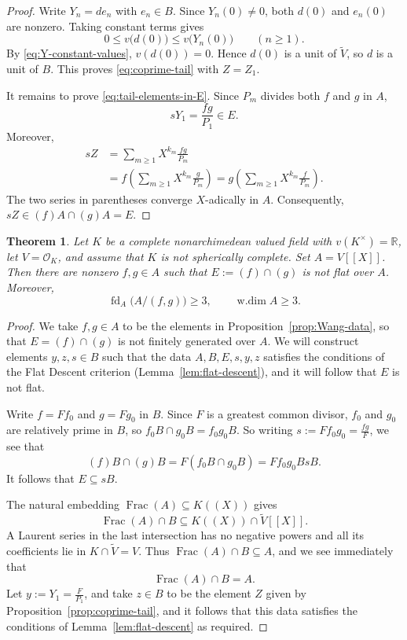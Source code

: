 \documentclass[12pt]{amsart}
\newtheorem{theorem}{Theorem}[section]
\theoremstyle{plain}
\newcommand{\wdim}{\operatorname{w.dim}}
\newcommand{\fd}{\operatorname{fd}}
\newcommand{\Frac}{\operatorname{Frac}}
\begin{document}
\begin{proof}
Write $Y_n=de_n$ with $e_n\in B$.  Since $Y_n(0)\neq0$, both
$d(0)$ and $e_n(0)$ are nonzero.  Taking constant terms gives
\[
  0\leq v\bigl(d(0)\bigr)\leq v\bigl(Y_n(0)\bigr)
  \qquad(n\geq1).
\]
By \eqref{eq:Y-constant-values}, $v(d(0))=0$.  Hence $d(0)$ is a unit
of $\widetilde V$, so $d$ is a unit of $B$.  This proves
\eqref{eq:coprime-tail} with $Z=Z_1$.

It remains to prove \eqref{eq:tail-elements-in-E}.  Since $P_m$
divides both $f$ and $g$ in $A$,
\[
  sY_1=\frac{fg}{P_1}\in E.
\]
Moreover,
\begin{align*}
  sZ
  &=\sum_{m\geq1}X^{k_m}\frac{fg}{P_m}\\
  &=f\left(\sum_{m\geq1}X^{k_m}\frac{g}{P_m}\right)
   =g\left(\sum_{m\geq1}X^{k_m}\frac{f}{P_m}\right).
\end{align*}
The two series in parentheses converge $X$-adically in $A$.
Consequently, $sZ\in(f)A\cap(g)A=E$.
\end{proof}

\begin{theorem}\label{thm:full-real-nonspherical}
Let $K$ be a complete nonarchimedean valued field with
$v(K^\times)=\mathbb R$, let $V=\mathcal O_K$, and assume that $K$ is
not spherically complete.  Set $A=V[[X]]$.  Then there are nonzero
$f,g\in A$ such that $E:=(f)\cap(g)$ is not flat over $A$.  Moreover,
\[
  \fd_A\bigl(A/(f,g)\bigr)\geq3,
  \qquad
  \wdim A\geq3.
\]
\end{theorem}

\begin{proof}
We take $f,g\in A$ to be the elements in Proposition~\ref{prop:Wang-data}, so that $E=(f)\cap (g)$ is not finitely generated over $A$. We will construct elements $y,z,s\in B$ such that the data $A,B,E,s,y,z$ satisfies the conditions of the Flat Descent criterion (Lemma~\ref{lem:flat-descent}), and it will follow that $E$ is not flat.

Write $f=Ff_0$ and $g=Fg_0$ in $B$. Since $F$ is a greatest common divisor,  $f_0$ and $g_0$ are relatively prime in $B$, so $f_0B\cap g_0B=f_0g_0B$. So writing $s:=Ff_0g_0=\frac{fg}{F}$, we see that
\[
  (f)B\cap(g)B
  =F(f_0B\cap g_0B)
  =Ff_0g_0B
  sB.
\]
It follows that $E\subseteq sB$.

The natural embedding
$\Frac(A)\subseteq K((X))$ gives
\[
  \Frac(A)\cap B
  \subseteq K((X))\cap\widetilde V[[X]].
\]
A Laurent series in the last intersection has no negative powers and
all its coefficients lie in
$K\cap\widetilde V=V$.  Thus $\Frac(A)\cap B\subseteq A$, and we see immediately that
\begin{equation}\label{eq:full-real-contraction}
  \Frac(A)\cap B=A.
\end{equation}
Let $y:=Y_1=\frac{F}{P_1}$, and take $z\in B$ to be the element $Z$ given by Proposition~\ref{prop:coprime-tail}, and it follows that this data satisfies the conditions of Lemma~\ref{lem:flat-descent} as required.\end{proof}
\end{document}
